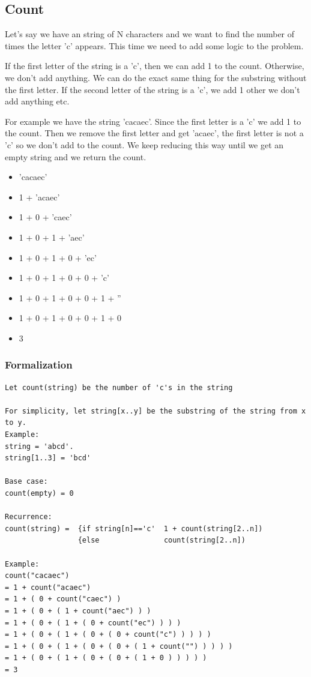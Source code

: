 \documentclass[11pt,oneside]{book}
\begin{document}
\subsection{Count}

Let's say we have an string of N characters and we want to find the number of times the letter 'c' appears. This time we need to add some logic to the problem.

If the first letter of the string is a 'c', then we can add 1 to the count. Otherwise, we don't add anything. We can do the exact same thing for the substring without the first letter. If the second letter of the string is a 'c', we add 1 other we don't add anything etc.

For example we have the string 'cacaec'. Since the first letter is a 'c' we add 1 to the count. Then we remove the first letter and get 'acaec', the first letter is not a 'c' so we don't add to the count. We keep reducing this way until we get an empty string and we return the count.

\begin{itemize}
\item 'cacaec'
\item 1 + 'acaec'
\item 1 + 0 + 'caec'
\item 1 + 0 + 1 + 'aec'
\item 1 + 0 + 1 + 0 + 'ec'
\item 1 + 0 + 1 + 0 + 0 + 'c'
\item 1 + 0 + 1 + 0 + 0 + 1 + ''
\item 1 + 0 + 1 + 0 + 0 + 1 + 0
\item 3
\end{itemize}

\subsubsection{Formalization}

\begin{lstlisting}
Let count(string) be the number of 'c's in the string

For simplicity, let string[x..y] be the substring of the string from x to y.
Example: 
string = 'abcd'.
string[1..3] = 'bcd'

Base case:
count(empty) = 0

Recurrence:
count(string) =  {if string[n]=='c'  1 + count(string[2..n])
                 {else               count(string[2..n])

Example:
count("cacaec")
= 1 + count("acaec") 
= 1 + ( 0 + count("caec") )
= 1 + ( 0 + ( 1 + count("aec") ) )
= 1 + ( 0 + ( 1 + ( 0 + count("ec") ) ) )
= 1 + ( 0 + ( 1 + ( 0 + ( 0 + count("c") ) ) ) )
= 1 + ( 0 + ( 1 + ( 0 + ( 0 + ( 1 + count("") ) ) ) )
= 1 + ( 0 + ( 1 + ( 0 + ( 0 + ( 1 + 0 ) ) ) ) )
= 3
\end{lstlisting}
\end{document}
